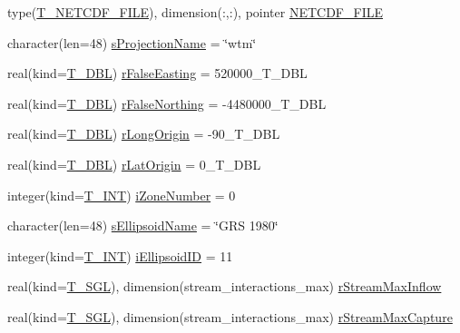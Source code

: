 \begin{DoxyCompactItemize}
\item 
type(\hyperlink{typetest_1_1_t___n_e_t_c_d_f___f_i_l_e}{T\_\-NETCDF\_\-FILE}), dimension(:,:), pointer \hyperlink{typetest_1_1_t___m_o_d_e_l___c_o_n_f_i_g_u_r_a_t_i_o_n_a1f2ecbb4c9e4c54f19997f3c1330b6e2}{NETCDF\_\-FILE}
\item 
character(len=48) \hyperlink{typetest_1_1_t___m_o_d_e_l___c_o_n_f_i_g_u_r_a_t_i_o_n_a98688f5654c8ceccaac435e839729246}{sProjectionName} = \char`\"{}wtm\char`\"{}
\item 
real(kind=\hyperlink{namespacetest_af379b935264d350d76bf75331181e241}{T\_\-DBL}) \hyperlink{typetest_1_1_t___m_o_d_e_l___c_o_n_f_i_g_u_r_a_t_i_o_n_a4abadc5dca1e8ea35a61c30f678ff760}{rFalseEasting} = 520000\_\-T\_\-DBL
\item 
real(kind=\hyperlink{namespacetest_af379b935264d350d76bf75331181e241}{T\_\-DBL}) \hyperlink{typetest_1_1_t___m_o_d_e_l___c_o_n_f_i_g_u_r_a_t_i_o_n_a4ec3e8079a450ecf9d3457d999a8f5b0}{rFalseNorthing} = -\/4480000\_\-T\_\-DBL
\item 
real(kind=\hyperlink{namespacetest_af379b935264d350d76bf75331181e241}{T\_\-DBL}) \hyperlink{typetest_1_1_t___m_o_d_e_l___c_o_n_f_i_g_u_r_a_t_i_o_n_a3165b791bf4761ac4f0a2640ac65b521}{rLongOrigin} = -\/90\_\-T\_\-DBL
\item 
real(kind=\hyperlink{namespacetest_af379b935264d350d76bf75331181e241}{T\_\-DBL}) \hyperlink{typetest_1_1_t___m_o_d_e_l___c_o_n_f_i_g_u_r_a_t_i_o_n_a8643d3b52e0e572fdd21c0ceab9db1ec}{rLatOrigin} = 0\_\-T\_\-DBL
\item 
integer(kind=\hyperlink{namespacetest_a6f91ebd89b58cfcc5da99faed9385c1e}{T\_\-INT}) \hyperlink{typetest_1_1_t___m_o_d_e_l___c_o_n_f_i_g_u_r_a_t_i_o_n_a17d7217143b32c1c33298c06c9eeef3a}{iZoneNumber} = 0
\item 
character(len=48) \hyperlink{typetest_1_1_t___m_o_d_e_l___c_o_n_f_i_g_u_r_a_t_i_o_n_ad1fb9512331f0915e4ea21e797c2f538}{sEllipsoidName} = \char`\"{}GRS 1980\char`\"{}
\item 
integer(kind=\hyperlink{namespacetest_a6f91ebd89b58cfcc5da99faed9385c1e}{T\_\-INT}) \hyperlink{typetest_1_1_t___m_o_d_e_l___c_o_n_f_i_g_u_r_a_t_i_o_n_a15427610c01a4eb5b44b03c128c05751}{iEllipsoidID} = 11
\item 
real(kind=\hyperlink{namespacetest_a04d8b9090502de3a00046fe904bc3d99}{T\_\-SGL}), dimension(stream\_\-interactions\_\-max) \hyperlink{typetest_1_1_t___m_o_d_e_l___c_o_n_f_i_g_u_r_a_t_i_o_n_a552c15fcde40fd7dde9097a1b9ce1fd6}{rStreamMaxInflow}
\item 
real(kind=\hyperlink{namespacetest_a04d8b9090502de3a00046fe904bc3d99}{T\_\-SGL}), dimension(stream\_\-interactions\_\-max) \hyperlink{typetest_1_1_t___m_o_d_e_l___c_o_n_f_i_g_u_r_a_t_i_o_n_a3b1d464775bde1a336d570653e7f558b}{rStreamMaxCapture}
\end{DoxyCompactItemize}


